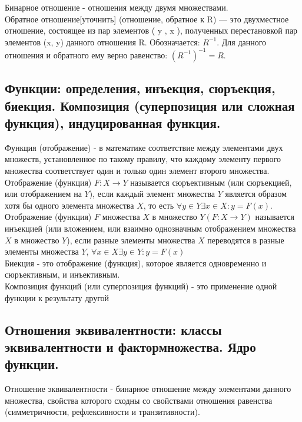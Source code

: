 \documentclass[a4paper, 12pt]{article}
\begin{document}
Бинарное отношение - отношения между двумя множествами.\\
Обратное отношение[уточнить] (отношение, обратное к R) — это двухместное отношение, состоящее из пар элементов ( y , x ), полученных перестановкой пар элементов (x, y) данного отношения  R. Обозначается: $ R^{{-1}} $. Для данного отношения и обратного ему верно равенство: $  (R^{{-1}})^{{-1}}=R $.\\

\subsection{Функции: определения, инъекция, сюръекция, биекция. Композиция (суперпозиция или сложная функция), индуцированная функция.}

Функция (отображение) - в математике соответствие между элементами двух множеств, установленное по такому правилу, что каждому элементу первого множества соответствует один и только один элемент второго множества.\\

Отображение (функция) $F:X \to Y$ называется сюръективным (или сюръекцией, или отображением на $Y$), если каждый элемент множества $Y$ является образом хотя бы одного элемента множества $X$, то есть $\forall y \in Y \exists x \in X : y=F(x)$.\\

Отображение (функция) $F$ множества $X$ в множество $Y(F: X \to Y)$ называется инъекцией (или вложением, или взаимно однозначным отображением множества $X$ в множество $Y$), если разные элементы множества $X$ переводятся в разные элементы множества $Y$, $\forall x \in X \exists y \in Y : y=F(x)$\\

Биекция - это отображение (функция), которое является одновременно и сюръективным, и инъективным.\\

Композиция функций (или суперпозиция функций) - это применение одной функции к результату другой\\

\subsection{Отношения эквивалентности: классы эквивалентности и фактормножества. Ядро функции.}
Отношение эквивалентности - бинарное отношение между элементами данного множества, свойства которого сходны со свойствами отношения равенства (симметричности, рефлексивности и транзитивности). 
\end{document}

